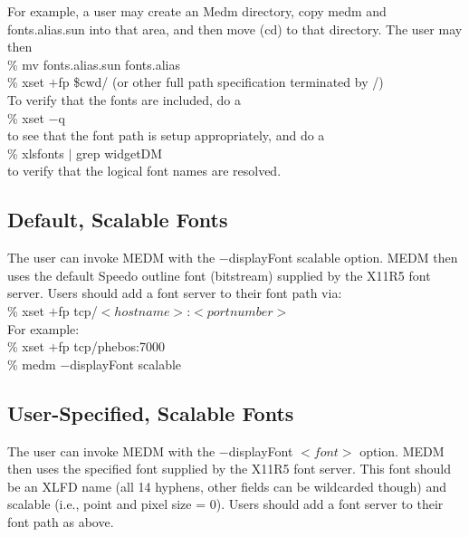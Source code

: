 \noindent For example, a user may create an Medm directory, copy medm and
fonts.alias.sun into that area, and then move (cd) to that directory.  The
user may then\\

\% mv fonts.alias.sun fonts.alias\\

\% xset $+$fp \$cwd/  \hspace{24pt}(or other full path specification terminated by /)\\

\noindent To verify that the fonts are included, do a\\

\% xset $-$q\\

\noindent to see that the font path is setup appropriately, and do a\\

\% xlsfonts $|$ grep widgetDM\\

\noindent to verify that the logical font names are resolved.\\


\subsection{Default, Scalable Fonts}

The user can invoke MEDM with the   $-$displayFont scalable    option.
MEDM then uses the default Speedo outline font (bitstream) supplied
by the X11R5 font server.  Users should add a font server to their
font path via:\\

\% xset $+$fp tcp/$<hostname>$:$<portnumber>$\\

\noindent For example:\\

\% xset $+$fp tcp/phebos:7000\\

\% medm $-$displayFont scalable\\


\subsection{User-Specified, Scalable Fonts}

The user can invoke MEDM with the   $-$displayFont $<font>$    option.
MEDM then uses the specified font supplied by the X11R5 font server.
This font should be an XLFD name (all 14 hyphens, other fields can be
wildcarded though) and scalable (i.e., point and pixel size = 0).
Users should add a font server to their font path as above.

